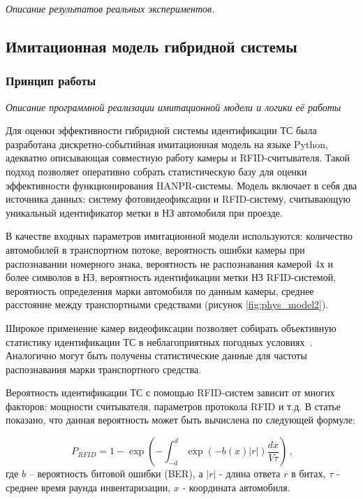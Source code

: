 \documentclass[12pt]{article}
\theoremstyle{definition}
\begin{document}
\textit{Описание результатов реальных экспериментов.}
\subsection{Имитационная модель гибридной системы}
\subsubsection{Принцип работы}
\textit{Описание программной реализации имитационной модели и логики её работы}

Для оценки эффективности гибридной системы идентификации ТС была разработана дискретно-событийная имитационная модель на языке Python, адекватно описывающая совместную работу камеры и RFID-считывателя. Такой подход позволяет оперативно собрать статистическую базу для оценки эффективности функционирования HANPR-системы. Модель включает в себя два источника данных: систему фотовидеофиксации и RFID-систему, считывающую уникальный идентификатор метки в НЗ автомобиля при проезде.

В качестве входных параметров имитационной модели используются: количество автомобилей в транспортном потоке, вероятность ошибки камеры при распознавании номерного знака, вероятность не распознавания камерой 4х и более символов в НЗ, вероятность идентификации метки НЗ RFID-системой, вероятность определения марки автомобиля по данным камеры, среднее расстояние между транспортными средствами (рисунок \ref{fig:phys_model2}).

Широкое применение камер видеофиксации позволяет собирать объективную статистику идентификации ТС в неблагоприятных погодных условиях~\cite{Plavac2024}. Аналогично могут быть получены статистические данные для частоты распознавания марки транспортного средства.

Вероятность идентификации ТС с помощью RFID-систем зависит от многих факторов: мощности считывателя, параметров протокола RFID и т.д. В статье~\cite{Vishn2023} показано, что данная вероятность может быть вычислена по следующей формуле:

\begin{equation}
\label{prob-ber}
    \ P_{RFID} = 1 - \exp{\left(-\int_{-d}^d \exp{(-b(x)|r|)}\frac{dx}{V\tau}\right)}\,,
\end{equation}
где $b$ – вероятность битовой ошибки (BER), а $|r|$ - длина ответа $r$ в битах, $\tau$ - среднее время раунда инвентаризации, $x$ - координата автомобиля.
\end{document}

